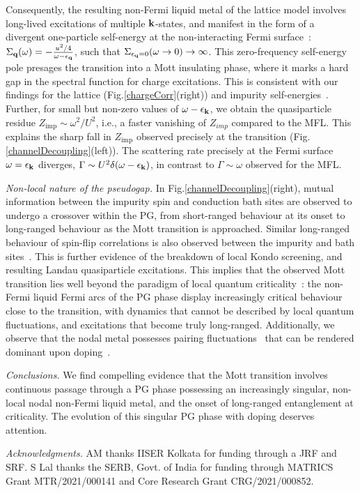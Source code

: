 \documentclass[%
 reprint,
superscriptaddress,
groupedaddress,
 amsmath,amssymb,
 aps,
prl,superscriptaddress
]{revtex4-2}
\begin{document}
Consequently, the resulting non-Fermi liquid metal of the lattice model involves long-lived excitations of multiple \({\bf k}\)-states, and manifest in the form of 
a divergent one-particle self-energy at the non-interacting Fermi surface~\cite{Phillips2020}:
	$\Sigma_{{\bf q}}(\omega) = -\frac{u^2/4}{\omega - \epsilon_{\bf q}}$, such that $\Sigma_{\epsilon_{\bf q}=0}(\omega \to 0)  \to \infty$. This zero-frequency self-energy pole 
presages the transition into a Mott insulating phase, where it marks a hard gap in the spectral function for charge excitations. This is consistent with our findings for the lattice (Fig.\ref{chargeCorr}(right)) and impurity self-energies~\cite{suppmat}. Further, for small but non-zero values of \(\omega - \epsilon_{\bf k}\), we obtain the quasiparticle residue \(Z_\text{imp} \sim \omega^2/U^2 \), i.e., a faster vanishing of $Z_{imp}$ compared to the MFL. This explains the sharp fall in $Z_\text{imp}$ observed precisely at the transition (Fig.\ref{channelDecoupling}(left)). The scattering rate precisely at the Fermi surface \(\omega=\epsilon_{\bf k}\) diverges, \(\Gamma \sim U^2\delta(\omega - \epsilon_{\bf k})\), in contrast to \(\Gamma \sim \omega\) observed for the MFL.
\par\noindent\textit{Non-local nature of the pseudogap.}
In Fig.\ref{channelDecoupling}(right), mutual information between the impurity spin and conduction bath sites are observed to undergo a crossover within the PG, from short-ranged behaviour at its onset to long-ranged behaviour as the Mott transition is approached. Similar long-ranged behaviour of spin-flip correlations is also observed between the impurity and bath sites~\cite{suppmat}. This is further evidence of the breakdown of local Kondo screening, and resulting Landau quasiparticle excitations. 
This implies that the observed Mott transition lies well beyond the paradigm of local quantum criticality~\cite{Si2001}: the non-Fermi liquid Fermi arcs of the PG phase display increasingly critical behaviour close to the transition, with dynamics that cannot be described by local quantum fluctuations, and excitations that become truly long-ranged. Additionally, we observe that the nodal metal possesses pairing fluctuations~\cite{suppmat} that can be rendered dominant upon doping~\cite{Phillips2020}.
\par\noindent\textit{Conclusions.} We find compelling evidence that the Mott transition involves continuous passage through a PG phase possessing an increasingly singular, non-local nodal non-Fermi liquid metal, and the onset of long-ranged entanglement at criticality. The evolution of this singular PG phase with doping 
deserves attention.
\par\noindent\textit{Acknowledgments.}
AM thanks IISER Kolkata for funding through a JRF and SRF. S Lal thanks the SERB, Govt. of India for funding through MATRICS Grant MTR/2021/000141 and Core Research Grant CRG/2021/000852.
\end{document}

